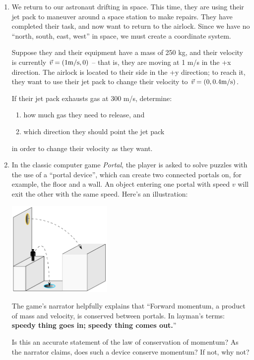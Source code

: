 \documentclass[12pt]{article}
\begin{document}
\begin{enumerate}
\item{ We return to our astronaut drifting in space. This time, they are using their jet pack to maneuver around a space station to make repairs. They have completed their task, and now want to return to the airlock. Since we have no ``north, south, east, west'' in space, we must create a coordinate system.

Suppose they and their equipment have a mass of 250 kg, and their velocity is currently $\vec v = (1 \rm m/\rm s, 0)$ -- that is, they are moving at 1 m/s in the +x direction. The airlock is located to their side in the +y direction; to reach it, they want to use their jet pack to change their velocity to $\vec v = (0, 0.4 \rm m/\rm s)$. 

If their jet pack exhausts gas at 300 m/s, determine:

\begin{enumerate}
	\item how much gas they need to release, and
	\item which direction they should point the jet pack
\end{enumerate}

in order to change their velocity as they want.
}
\item{In the classic computer game {\it Portal}, the player is asked to solve
	puzzles with the use of a ``portal device'', which can create two connected portals
	on, for example, the floor and a wall. An object entering one portal with speed $v$
	will exit the other with the same speed. Here's an illustration:
	
	\includegraphics[width=0.4\textwidth]{Portal_physics-2.png}
	
	The game's narrator helpfully explains that ``Forward momentum, a product of mass
	and velocity, is conserved between portals. In layman's terms: {\bf speedy thing
		goes in; speedy thing comes out.}''


Is this an accurate statement of the law of conservation of momentum? As the
		narrator claims, does such a device conserve momentum? If not, why not?

}

\end{enumerate}
\end{document}
